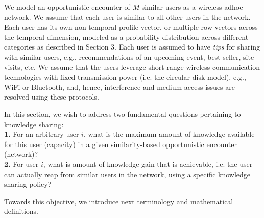 \documentclass[conference]{IEEEtran}
\theoremstyle{definition}
\begin{document}
We model an opportunistic encounter of $M$ similar users as a wireless adhoc network. We assume that each user is similar to all other users in the network. Each user has its own non-temporal profile vector, or multiple row vectors across the temporal dimension, modeled as a probability distribution across different categories as described in Section 3. Each user is assumed to have \textit{tips} for sharing with similar users, e.g., recommendations of an upcoming event, best seller, site visits, etc. We assume that the users leverage short-range wireless communication technologies with fixed transmission power (i.e. the circular disk model), e.g., WiFi or Bluetooth, and, hence, interference and medium access issues are resolved using these protocols.

In this section, we wish to address two fundamental questions pertaining to knowledge sharing:\\
{\bf 1.} For an arbitrary user $i$, what is the maximum amount of knowledge available for this user (capacity) in a given similarity-based opportunistic encounter (network)?\\
{\bf 2.} For user $i$, what is amount of knowledge gain that is achievable, i.e. the user can actually reap from similar users in the network, using a specific knowledge sharing policy?

Towards this objective, we introduce next terminology and mathematical definitions.


\end{document}
